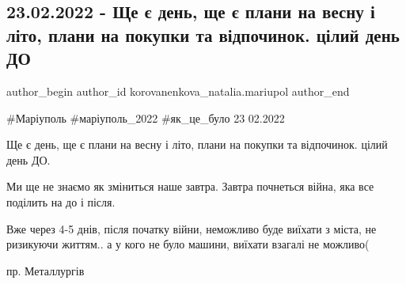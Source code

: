  
 
 
 
 

\subsection{23.02.2022 - Ще є день, ще є плани на весну і літо, плани на покупки та відпочинок. цілий день ДО}
\label{sec:23_02_2023.fb.korovanenkova_natalia.mariupol.1.cilyj_den_DO}

\ifcmt
 author_begin
   author_id korovanenkova_natalia.mariupol
 author_end
\fi

\#Маріуполь \#маріуполь\_2022 \#як\_це\_було 23 02.2022

Ще є день, ще є плани на весну і літо, плани на покупки та відпочинок. цілий день ДО. 

Ми ще не знаємо як зміниться наше завтра. Завтра почнеться війна, яка все поділить на до і після. 

Вже через 4-5 днів, після початку війни, неможливо буде виїхати з міста, не
ризикуючи життям.. а у кого не було машини, виїхати взагалі не можливо(

пр. Металлургів

